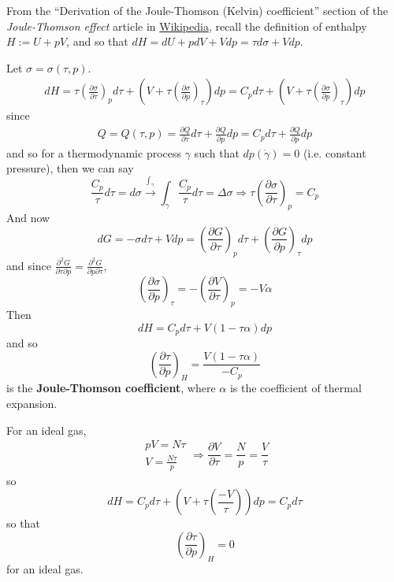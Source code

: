 \documentclass[10pt]{amsart}
\begin{document}
\begin{multicols*}{2}
From the ``Derivation of the Joule-Thomson (Kelvin) coefficient'' section of the \emph{Joule-Thomson effect} article in \href{https://en.wikipedia.org/wiki/Joule–Thomson_effect}{Wikipedia}, recall the definition of enthalpy $H:= U + pV$, and so that $dH= dU+ pdV + Vdp=\tau d\sigma + Vdp$.  

Let $\sigma = \sigma(\tau,p)$.  
\[
\begin{gathered}
  dH = \tau \left( \frac{ \partial \sigma}{ \partial \tau } \right)_p d\tau + (V + \tau \left( \frac{ \partial \sigma }{ \partial p }\right)_{\tau} ) dp = C_p d\tau + (V + \tau \left( \frac{ \partial \sigma }{ \partial p }\right)_{\tau} ) dp
\end{gathered}
\]
since
\[
\begin{gathered}
Q = Q(\tau,p) = \frac{ \partial Q}{ \partial \tau} d\tau + \frac{ \partial Q}{ \partial p } dp = C_p d\tau + \frac{ \partial Q}{ \partial p} dp
\end{gathered}
\]
and so for a thermodynamic process $\gamma$ such that $dp(\dot{\gamma})=0$ (i.e. constant pressure), then we can say
\[
\frac{C_p}{\tau}d\tau = d\sigma \xrightarrow{ \int_{\gamma } } \int_{\gamma} \frac{C_p}{\tau} d\tau = \Delta \sigma \Longrightarrow \tau \left( \frac{ \partial \sigma }{ \partial \tau } \right)_p = C_p
\]
And now 
\[
dG = -\sigma d\tau  + Vdp = \left( \frac{ \partial G}{ \partial \tau } \right)_p d\tau + \left( \frac{ \partial G}{ \partial p } \right)_{\tau} dp
\]
and since $\frac{ \partial^2 G}{ \partial \tau \partial p} = \frac{ \partial^2 G}{ \partial p \partial \tau}$, 
\[
\left( \frac{ \partial \sigma }{ \partial p } \right)_{\tau} = - \left( \frac{ \partial V}{ \partial \tau} \right)_p = -V\alpha
\]
Then
\[
dH = C_p d\tau + V(1-\tau \alpha) dp
\]
and so 
\begin{equation}\label{Eq:JouleThomsoncoeff}
\left( \frac{ \partial \tau}{ \partial p }\right)_H = \frac{ V(1-\tau \alpha )}{-C_p}
\end{equation}
is the \textbf{Joule-Thomson coefficient}, where $\alpha$ is the coefficient of thermal expansion.  

For an ideal gas, 
\[
\begin{gathered}
  pV = N\tau \\ 
  V = \frac{N\tau}{p}
\end{gathered} \Longrightarrow \frac{ \partial V}{ \partial \tau} = \frac{N}{p} = \frac{V}{\tau}
\]
so
\[
dH = C_pd\tau + ( V + \tau \left( \frac{-V}{\tau} \right) ) dp = C_p d\tau 
\]
so that 
\[
\left( \frac{ \partial \tau}{ \partial p} \right)_H = 0 
\]
for an ideal gas.  


\end{multicols*}
\end{document}
